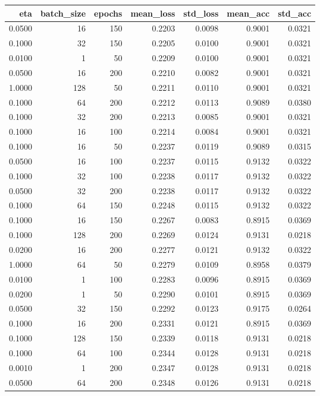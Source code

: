 \begin{tabular}{rrrrrrr}
\toprule
eta & batch_size & epochs & mean_loss & std_loss & mean_acc & std_acc \\
\midrule
0.0500 & 16 & 150 & 0.2203 & 0.0098 & 0.9001 & 0.0321 \\
0.1000 & 32 & 150 & 0.2205 & 0.0100 & 0.9001 & 0.0321 \\
0.0100 & 1 & 50 & 0.2209 & 0.0100 & 0.9001 & 0.0321 \\
0.0500 & 16 & 200 & 0.2210 & 0.0082 & 0.9001 & 0.0321 \\
1.0000 & 128 & 50 & 0.2211 & 0.0110 & 0.9001 & 0.0321 \\
0.1000 & 64 & 200 & 0.2212 & 0.0113 & 0.9089 & 0.0380 \\
0.1000 & 32 & 200 & 0.2213 & 0.0085 & 0.9001 & 0.0321 \\
0.1000 & 16 & 100 & 0.2214 & 0.0084 & 0.9001 & 0.0321 \\
0.1000 & 16 & 50 & 0.2237 & 0.0119 & 0.9089 & 0.0315 \\
0.0500 & 16 & 100 & 0.2237 & 0.0115 & 0.9132 & 0.0322 \\
0.1000 & 32 & 100 & 0.2238 & 0.0117 & 0.9132 & 0.0322 \\
0.0500 & 32 & 200 & 0.2238 & 0.0117 & 0.9132 & 0.0322 \\
0.1000 & 64 & 150 & 0.2248 & 0.0115 & 0.9132 & 0.0322 \\
0.1000 & 16 & 150 & 0.2267 & 0.0083 & 0.8915 & 0.0369 \\
0.1000 & 128 & 200 & 0.2269 & 0.0124 & 0.9131 & 0.0218 \\
0.0200 & 16 & 200 & 0.2277 & 0.0121 & 0.9132 & 0.0322 \\
1.0000 & 64 & 50 & 0.2279 & 0.0109 & 0.8958 & 0.0379 \\
0.0100 & 1 & 100 & 0.2283 & 0.0096 & 0.8915 & 0.0369 \\
0.0200 & 1 & 50 & 0.2290 & 0.0101 & 0.8915 & 0.0369 \\
0.0500 & 32 & 150 & 0.2292 & 0.0123 & 0.9175 & 0.0264 \\
0.1000 & 16 & 200 & 0.2331 & 0.0121 & 0.8915 & 0.0369 \\
0.1000 & 128 & 150 & 0.2339 & 0.0118 & 0.9131 & 0.0218 \\
0.1000 & 64 & 100 & 0.2344 & 0.0128 & 0.9131 & 0.0218 \\
0.0010 & 1 & 200 & 0.2347 & 0.0128 & 0.9131 & 0.0218 \\
0.0500 & 64 & 200 & 0.2348 & 0.0126 & 0.9131 & 0.0218 \\

\end{tabular}
